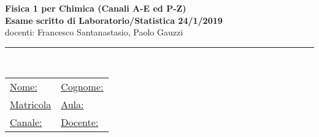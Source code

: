 \documentclass[10pt,a4paper,fleqn]{article}
\begin{document}
\pagestyle{empty}

%
%
\newsavebox{\savepar}
\newenvironment{boxit}{\begin{lrbox}{\savepar}
\begin{minipage}[b]{16.0cm}}
{\end{minipage}\end{lrbox}\fbox{\usebox{\savepar}}}
\newcommand{\myblist}[1]{\begin{list}{#1}{\setlength{\topsep}{1.8mm}
\setlength{\parskip}{0mm} \setlength{\partopsep}{0mm} \setlength{\parsep}{0mm}
\setlength{\itemsep}{0mm}}}
\newcommand{\myhfill}[1]{\hfill {\it #1} = \underline{$~~~~~~~~~~~~~~~~~~~~~~~~~~~$}}
\newcommand{\myhfiyn}[0]{\hfill $\Box$~{\sc si}~~~~~~~~$\Box$~{\sc no}}
\newcommand{\myhfild}[2]
{\hfill {\it #1}= \underline{$~~~~~~~~~~$};~ {\it #2}= \underline{$~~~~~~~~~~$}}
\newcommand{\myhfilt}[3]
{\hfill {\it #1}= \underline{$~~~~~~~~~~~~~$};~ 
{\it #2}= \underline{$~~~~~~~~~~~~~$};~{\it #3}= \underline{$~~~~~~~~~~~~~$}}
%

\setlength{\unitlength}{1mm} 
\setlength{\headheight}{0mm} %

\newcommand{\s}{\text{s}}
\newcommand{\km}{\text{km}}
\newcommand{\kg}{\text{kg}}


\vspace*{-3.5cm}
\Large
{
\begin{center}
\vspace{0.1cm}
{\bf  Fisica 1 per Chimica (Canali A-E ed P-Z)} \\
{\bf Esame scritto di Laboratorio/Statistica 24/1/2019}   \\
docenti: Francesco Santanastasio, Paolo Gauzzi
   \\
\end{center}
\noindent\rule{18cm}{0.4pt}  \\
\normalsize
%
\begin{tabular}{ll}
{\underline{Nome:}}  \hspace{6cm} & {\underline{Cognome:}} \\[0.35cm]
{\underline {Matricola}} & {\underline {Aula:}}  \\[0.35cm]
{\underline {Canale:}} & {\underline {Docente:}}
\end{tabular}
\vspace{0.5cm}
}
\small
\end{document}
